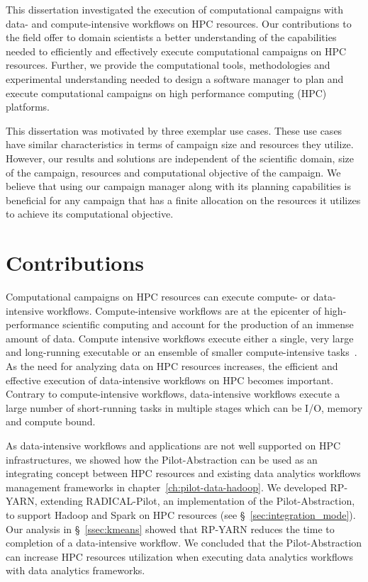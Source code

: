 This dissertation investigated the execution of computational campaigns with
data- and compute-intensive workflows on HPC resources. Our contributions to 
the field offer to domain scientists a better understanding of the capabilities 
needed to efficiently and effectively execute computational campaigns on HPC 
resources. Further, we provide the computational tools, methodologies and 
experimental understanding needed to design a software manager to plan and 
execute computational campaigns on high performance computing (HPC) platforms.

This dissertation was motivated by three exemplar use cases. These use cases 
have similar characteristics in terms of campaign size and resources they 
utilize. However, our results and solutions are independent of the scientific 
domain, size of the campaign, resources and computational objective of the 
campaign. We believe that using our campaign manager along with its planning 
capabilities is beneficial for any campaign that has a finite allocation on the 
resources it utilizes to achieve its computational objective. 

\section{Contributions}

Computational campaigns on HPC resources can execute compute- or data- intensive
workflows. Compute-intensive workflows are at the epicenter of high-performance
scientific computing and account for the production of an immense amount of
data. Compute intensive workflows execute either a single, very large and
long-running executable or an ensemble of smaller compute-intensive
tasks~\cite{balasubramanian2018harnessing}. As the need for analyzing data on
HPC resources increases, the efficient and effective execution of data-intensive
workflows on HPC becomes important. Contrary to compute-intensive workflows,
data-intensive workflows execute a large number of short-running tasks in
multiple stages which can be I/O, memory and compute bound.

As data-intensive workflows and applications are not well supported on HPC
infrastructures, we showed how the Pilot-Abstraction can be used as an
integrating concept between HPC resources and existing data analytics workflows 
management frameworks in chapter~\ref{ch:pilot-data-hadoop}. We developed 
RP-YARN, extending RADICAL-Pilot, an implementation of the Pilot-Abstraction, 
to support Hadoop and Spark on HPC resources
(see \S~\ref{sec:integration_mode}). Our analysis in \S~\ref{ssec:kmeans} 
showed that RP-YARN reduces the time to completion of a data-intensive 
workflow. We concluded that the Pilot-Abstraction can increase HPC resources 
utilization when executing data analytics workflows with data analytics 
frameworks.

